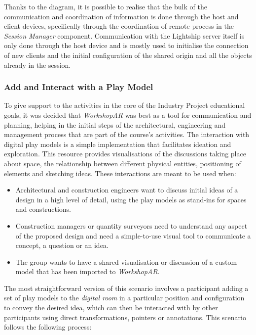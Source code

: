 Thanks to the diagram, it is possible to realise that the bulk of the communication and coordination of information is done through the host and client devices, specifically through the
coordination of remote process in the \emph{Session Manager} component. Communication with the Lightship server itself is only done through the host device and is mostly used to
initialise the connection of new clients and the initial configuration of the shared origin and all the objects already in the session.

\subsubsection{Add and Interact with a Play Model \label{sec:4-3-5-2}}

To give support to the activities in the core of the Industry Project educational goals, it was decided that \emph{WorkshopAR} was best as a tool for communication and planning, helping
in the initial steps of the architectural, engineering and management process that are part of the course's activities. The interaction with digital play models is a simple implementation
that facilitates ideation and exploration. This resource provides visualisations of the discussions taking place about space, the relationship between different physical entities,
positioning of elements and sketching ideas. These interactions are meant to be used when:

\begin{itemize}
    \item Architectural and construction engineers want to discuss initial ideas of a design in a high level of detail, using the play models as stand-ins for spaces and constructions.
    \item Construction managers or quantity surveyors need to understand any aspect of the proposed design and need a simple-to-use visual tool to communicate a concept, a question or an idea.
    \item The group wants to have a shared visualisation or discussion of a custom model that has been imported to \emph{WorkshopAR}.
\end{itemize}

The most straightforward version of this scenario involves a participant adding a set of play models to the \emph{digital room} in a particular position and configuration to convey the desired idea,
which can then be interacted with by other participants using direct transformations, pointers or annotations. This scenario follows the following process:

